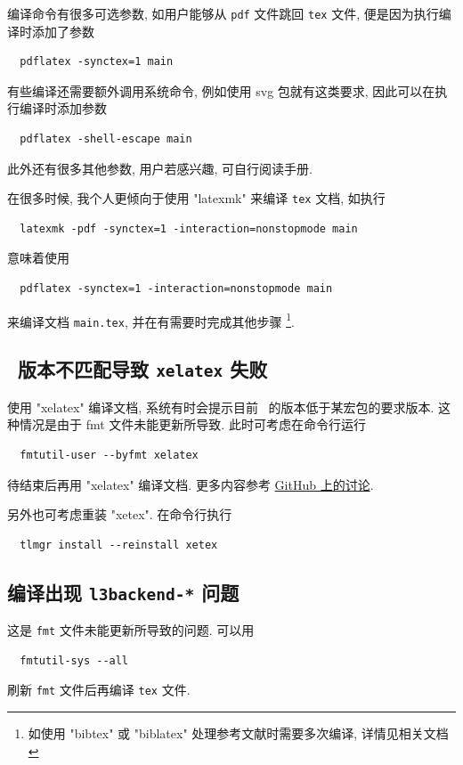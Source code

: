 编译命令有很多可选参数, 如用户能够从 \texttt{pdf} 文件跳回 \texttt{tex} 文件,
便是因为执行编译时添加了参数
\begin{lstlisting}
  pdflatex -synctex=1 main
\end{lstlisting}
有些编译还需要额外调用系统命令,
例如使用 \textsf{svg} 包就有这类要求,
因此可以在执行编译时添加参数
\begin{lstlisting}
  pdflatex -shell-escape main
\end{lstlisting}
此外还有很多其他参数, 用户若感兴趣, 可自行阅读手册.

在很多时候, 我个人更倾向于使用 "latexmk" 来编译 \texttt{tex} 文档,
如执行
\begin{lstlisting}
  latexmk -pdf -synctex=1 -interaction=nonstopmode main
\end{lstlisting}
意味着使用
\begin{lstlisting}
  pdflatex -synctex=1 -interaction=nonstopmode main
\end{lstlisting}
来编译文档 \texttt{main.tex}, 并在有需要时完成其他步骤%
\footnote{如使用 "bibtex" 或 "biblatex" 处理参考文献时需要多次编译,
详情见相关文档}.

\subsection{\LaTeXe\ 版本不匹配导致 \texttt{xelatex} 失败}

使用 "xelatex" 编译文档,
系统有时会提示目前 \LaTeXe\ 的版本低于某宏包的要求版本.
这种情况是由于 \textsf{fmt} 文件未能更新所导致.
此时可考虑在命令行运行
\begin{lstlisting}
  fmtutil-user --byfmt xelatex
\end{lstlisting}
待结束后再用 "xelatex" 编译文档.
更多内容参考
\href{https://github.com/CTeX-org/forum/issues/70}{GitHub 上的讨论}.

另外也可考虑重装 "xetex".
在命令行执行
\begin{lstlisting}
  tlmgr install --reinstall xetex
\end{lstlisting}

\subsection{编译出现 \texttt{l3backend-*} 问题}

这是 \texttt{fmt} 文件未能更新所导致的问题.
可以用
\begin{lstlisting}
  fmtutil-sys --all
\end{lstlisting}
刷新 \texttt{fmt} 文件后再编译 \texttt{tex} 文件.

